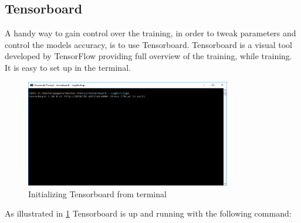 \documentclass[USenglish]{ifimaster}  %
\begin{document}
\subsection{Tensorboard}
A handy way to gain control over the training, in order to tweak parameters and control the models accuracy, is to use Tensorboard. Tensorboard is a visual tool developed by TensorFlow providing full overview of the training, while training. It is easy to set up in the terminal.
\begin{figure}[ht]
    \centering
    \includegraphics[width=0.8\textwidth]{bilder/tensorboard_anaconda_prompt.PNG}
    \caption{Initializing Tensorboard from terminal}
    \label{fig:tensorboard_anaconda_prompt}
\end{figure}
\newline
As illustrated in \cref{fig:tensorboard_anaconda_prompt} Tensorboard is up and running with the following command: 
\end{document}
